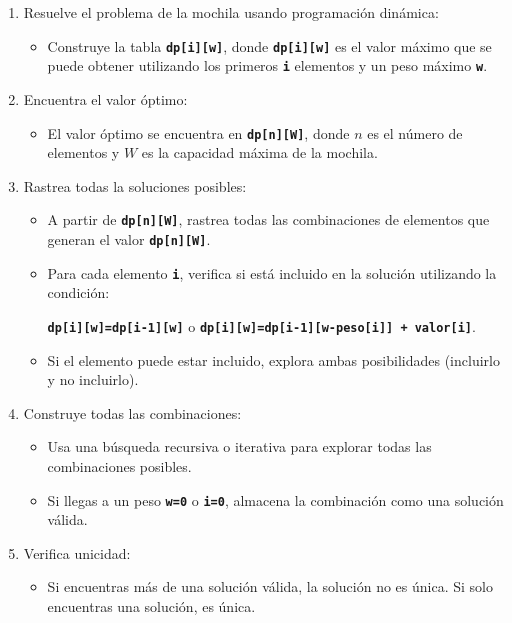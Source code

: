 \begin{enumerate}[label=\color{red}\textbf{\arabic*)}]
\begin{enumerate}[label=\arabic*)]
\item Resuelve el problema de la mochila usando programación dinámica:
\begin{itemize}[label=\textbullet]
\item Construye la tabla \textbf{\texttt{dp[i][w]}}, donde \textbf{\texttt{dp[i][w]}} es el valor máximo que se puede obtener utilizando los primeros \textbf{\texttt{i}} elementos y un peso máximo \textbf{\texttt{w}}.
\end{itemize}
\item Encuentra el valor óptimo:
\begin{itemize}[label=\textbullet]
\item El valor óptimo se encuentra en \textbf{\texttt{dp[n][W]}}, donde $n$ es el número de elementos y $W$ es la capacidad máxima de la mochila.
\end{itemize}
\item Rastrea todas la soluciones posibles:
 \begin{itemize}[label=\textbullet]
   \item  A partir de \textbf{\texttt{dp[n][W]}}, rastrea todas las combinaciones de elementos que generan el valor \textbf{\texttt{dp[n][W]}}.
   \item Para cada elemento \textbf{\texttt{i}}, verifica si está incluido en la solución utilizando la condición: 
     \begin{center}
       \textbf{\texttt{dp[i][w]=dp[i-1][w]}} o \textbf{\texttt{dp[i][w]=dp[i-1][w-peso[i]] + valor[i]}}.  
     \end{center}
   \item Si el elemento puede estar incluido, explora ambas posibilidades (incluirlo y no incluirlo).
 \end{itemize}
  \item Construye todas las combinaciones:
    \begin{itemize}[label=\textbullet]
      \item Usa una búsqueda recursiva o iterativa para explorar todas las combinaciones posibles.
      \item Si llegas a un peso \textbf{\texttt{w=0}} o \textbf{\texttt{i=0}}, almacena la combinación como una solución válida.
    \end{itemize}
  \item Verifica unicidad:
    \begin{itemize}[label=\textbullet]
      \item Si encuentras más de una solución válida, la solución no es única. Si solo encuentras una solución, es única.

\end{itemize}
\end{enumerate}
\end{enumerate}
